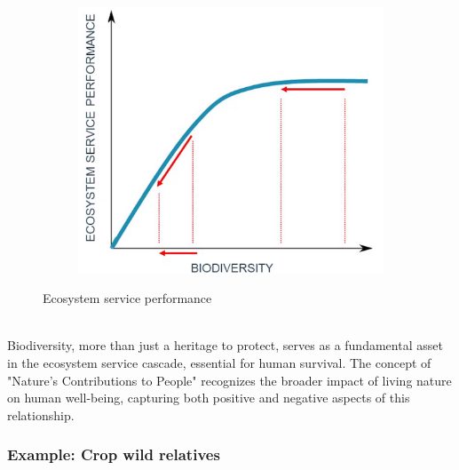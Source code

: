 \documentclass[../summary.tex]{subfiles}
\begin{document}
\begin{figure}[H]
\begin{subfigure}[b]{0.25\textwidth}
		\includegraphics[width=\textwidth]{../images/ecosystem_service_cascade_3.png}
		\caption{}
		\label{fig:ecosystemserviceperformance3}
	\end{subfigure}
	\caption{Ecosystem service performance}
	\label{fig:ecosystemserviceperformance}
\end{figure}

\ \\
Biodiversity, more than just a heritage to protect, serves as a fundamental asset in the ecosystem service cascade, essential for human survival. The concept of "Nature's Contributions to People" recognizes the broader impact of living nature on human well-being, capturing both positive and negative aspects of this relationship.

\subsubsection{Example: Crop wild relatives}
\end{document}
